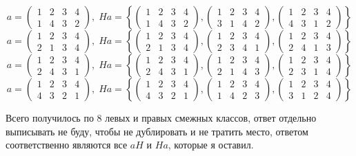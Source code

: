 \documentclass[a4paper,12pt]{article}
\begin{document}
\begin{itemize}
\[a = \begin{pmatrix} 1 & 2 & 3 & 4 \\ 1&4&3&2\end{pmatrix}, \; Ha = \left\{\begin{pmatrix} 1 & 2 & 3 & 4 \\ 1&4&3&2\end{pmatrix}, \begin{pmatrix} 1 & 2 & 3 & 4 \\ 3&1&4&2\end{pmatrix}, \begin{pmatrix} 1 & 2 & 3 & 4 \\ 4&3&1&2\end{pmatrix} \right\}\]
\[a = \begin{pmatrix} 1 & 2 & 3 & 4 \\ 2&1&3&4\end{pmatrix}, \; Ha = \left\{\begin{pmatrix} 1 & 2 & 3 & 4 \\ 2&1&3&4\end{pmatrix}, \begin{pmatrix} 1 & 2 & 3 & 4 \\ 2&3&4&1\end{pmatrix}, \begin{pmatrix} 1 & 2 & 3 & 4 \\ 2&4&1&3\end{pmatrix} \right\}\]
\[a = \begin{pmatrix} 1 & 2 & 3 & 4 \\ 2&4&3&1\end{pmatrix}, \; Ha = \left\{\begin{pmatrix} 1 & 2 & 3 & 4 \\ 2&4&3&1\end{pmatrix}, \begin{pmatrix} 1 & 2 & 3 & 4 \\ 2&1&4&3\end{pmatrix}, \begin{pmatrix} 1 & 2 & 3 & 4 \\ 2&3&1&4\end{pmatrix} \right\}\]
\[a = \begin{pmatrix} 1 & 2 & 3 & 4 \\ 4&3&2&1\end{pmatrix}, \; Ha = \left\{\begin{pmatrix} 1 & 2 & 3 & 4 \\ 4&3&2&1\end{pmatrix}, \begin{pmatrix} 1 & 2 & 3 & 4 \\ 1&4&2&3\end{pmatrix}, \begin{pmatrix} 1 & 2 & 3 & 4 \\ 3&1&2&4\end{pmatrix} \right\}\]
\end{itemize}
Всего получилось по 8 левых и правых смежных классов, ответ отдельно выписывать не буду, чтобы не дублировать и не тратить место, ответом соответственно являются все $aH$ и $Ha$, которые я оставил.
\end{document}
